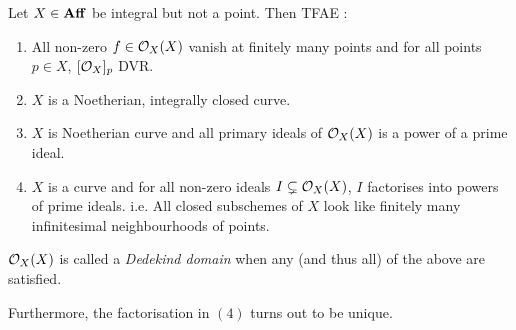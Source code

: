 \documentclass[./main.tex]{subfiles}
\begin{document}
  
\begin{prop}
  
  Let $X \in \mathbf{Aff}$ be integral but not a point.
  Then TFAE :
  \begin{enumerate}
    \item All non-zero $f \in \mathcal{O}_X(X)$ vanish at finitely many points and 
    for all points $p \in X$, $[\mathcal{O}_X]_p$ DVR.
    \item $X$ is a Noetherian, integrally closed curve.
    \item $X$ is Noetherian curve and all primary ideals of $\mathcal{O}_X(X)$
    is a power of a prime ideal. 
    \item $X$ is a curve and for all non-zero ideals $I \subsetneq \mathcal{O}_X(X)$,
    $I$ factorises into powers of prime ideals. 
    i.e. All closed subschemes of $X$ look like 
    finitely many infinitesimal neighbourhoods of points. 
  \end{enumerate}
  $\mathcal{O}_X(X)$ is called a \emph{Dedekind domain} when 
  any (and thus all) of the above are satisfied.

  Furthermore, the factorisation in $(4)$ turns out to be unique.

\end{prop}
\end{document}
